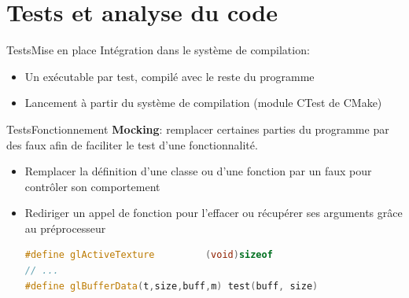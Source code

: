 

\section{Tests et analyse du code}




  \begin{frame}{Tests}{Mise en place}
    Intégration dans le système de compilation:
    \begin{itemize}
      \item Un exécutable par test, compilé avec le reste du programme
      \item Lancement à partir du système de compilation (module CTest
        de CMake)
    \end{itemize}
  \end{frame}

  
  \begin{frame}[fragile]{Tests}{Fonctionnement}
    \textbf{Mocking}: remplacer certaines parties du programme par des
    faux afin de faciliter le test d'une fonctionnalité.
    \begin{itemize}
      \item Remplacer la définition d'une classe ou d'une fonction par
        un faux pour contrôler son comportement
      \item Rediriger un appel de fonction pour l'effacer ou récupérer
        ses arguments grâce au préprocesseur
        \begin{lstlisting}[language=C++, basicstyle=\small]
#define glActiveTexture         (void)sizeof
// ...
#define glBufferData(t,size,buff,m) test(buff, size)
        \end{lstlisting}
    \end{itemize}
  \end{frame}

